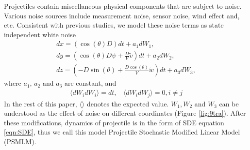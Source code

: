 \documentclass[letterpaper, 10 pt, conference]{ieeeconf}  %
\begin{document}
Projectiles contain miscellaneous physical components that are subject to noise. Various noise sources include measurement noise, sensor noise, wind effect and, etc. Consistent with previous studies, we model these noise terms as state independent white noise \cite{yuan2014impact, yuan2010impact, hutchins1998imm, tsai1991angle, maley2015optimal}
\begin{gather}
dx=(\cos{(\theta)} D)dt + a_1 d{W_1}, \label{eqn:noise1} \\ 
dy=(\cos{(\theta)} D \psi + \frac{D}{V} \tilde{v})dt + a_2 d{W_2}, \label{eqn:noise2} \\ 
dz=(-D \sin{(\theta)} + \frac{D \cos{(\theta)}}{V} \tilde{w})dt + a_3 d{W_3}, \label{eqn:noise3}
\end{gather}
where $a_1$, $a_2$ and $a_3$ are constant, and 
\begin{gather}
\langle dW_i dW_i \rangle = dt, \ \ \ \
\langle dW_i dW_j \rangle = 0, i \neq j
\end{gather}
In the rest of this paper, $\langle \rangle$ denotes the expected value. $W_1, W_2$ and $W_3$ can be understood as the effect of noise on different coordinates (Figure \ref{fig:9tra}). After these modifications, dynamics of projectile is in the form of SDE equation \eqref{eqn:SDE}, thus we call this model Projectile Stochastic Modified Linear Model (PSMLM).
\end{document}
